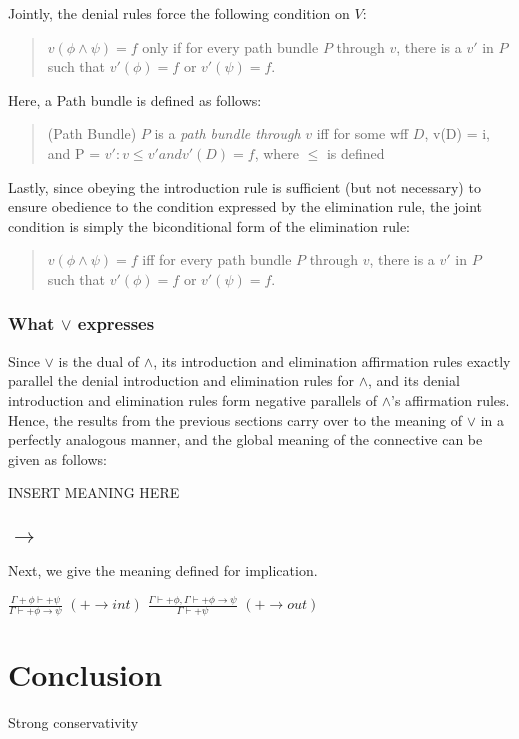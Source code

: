 \documentclass[]{article}
\begin{document}
Jointly, the denial rules force the following condition on $V$:

\begin{quote}
$v(\phi\wedge\psi) = f$ only if for every path bundle $P$ through $v$, there is a $v'$ in $P$ such that $v'(\phi) = f$ or $v'(\psi) = f$.
\end{quote}

Here, a Path bundle is defined as follows:

\begin{quote}
(Path Bundle) $P$ is a \textit{path bundle through} $v$ iff for some wff $D$, v(D) = i, and P = ${v': v\leq v' and v'(D) = f}$, where $\leq$ is defined 
\end{quote}

Lastly, since obeying the introduction rule is sufficient (but not necessary) to ensure obedience to the condition expressed by the elimination rule, the joint condition is simply the biconditional form of the elimination rule:

\begin{quote}
$v(\phi\wedge\psi) = f$ iff for every path bundle $P$ through $v$, there is a $v'$ in $P$ such that $v'(\phi) = f$ or $v'(\psi) = f$.
\end{quote}

\subsubsection{What $\vee$ expresses}
Since $\vee$ is the dual of $\wedge$, its introduction and elimination affirmation rules exactly parallel the denial introduction and elimination rules for $\wedge$, and its denial introduction and elimination rules form negative parallels of $\wedge$'s affirmation rules. Hence, the results from the previous sections carry over to the meaning of $\vee$ in a perfectly analogous manner, and the global meaning of the connective can be given as follows:

INSERT MEANING HERE
\subsection{$\rightarrow$}
Next, we give the meaning defined for implication. 

$\frac{\Gamma +\phi \vdash +\psi}{\Gamma \vdash +\phi\rightarrow\psi}$ $(+\rightarrow int)$ 
$\frac{\Gamma \vdash +\phi, \Gamma \vdash +\phi\rightarrow\psi}{\Gamma \vdash +\psi}$ $(+\rightarrow out)$

\section{Conclusion}
Strong conservativity
\end{document}
